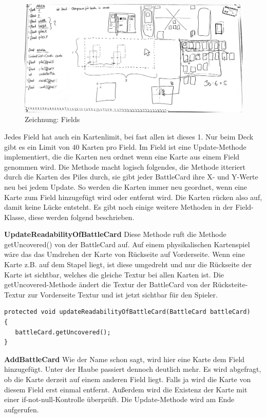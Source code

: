 \begin{figure}[h]
\includegraphics[width=1\textwidth]{../img/bild_fields.JPG}
\caption{Zeichnung: Fields}
\label{fig:Zeichung Fields}
\end{figure}

Jedes Field hat auch ein Kartenlimit, bei fast allen ist dieses 1. Nur beim Deck gibt es ein Limit von 40 Karten pro Field.
Im Field ist eine Update-Methode implementiert, die die Karten neu ordnet wenn eine Karte aus einem Field genommen wird. Die Methode macht logisch folgendes, die Methode itteriert durch die Karten des Piles durch, sie gibt jeder BattleCard ihre X- und Y-Werte neu bei jedem Update. So werden die Karten immer neu geordnet, wenn eine Karte zum Field hinzugefügt wird oder entfernt wird. Die Karten rücken also auf, damit keine Lücke entsteht.
Es gibt noch einige weitere Methoden in der Field-Klasse, diese werden folgend beschrieben.

\textbf{UpdateReadabilityOfBattleCard}
Diese Methode ruft die Methode getUncovered() von der BattleCard auf. Auf einem physikalischen Kartenspiel wäre das das Umdrehen der Karte von Rückseite auf Vorderseite. Wenn eine Karte z.B. auf dem Stapel liegt, ist diese umgedreht und nur die Rückseite der Karte ist sichtbar, welches die gleiche Textur bei allen Karten ist. Die getUncovered-Methode ändert die Textur der BattleCard von der Rücksteite-Textur zur Vorderseite Textur und ist jetzt sichtbar für den Spieler.

\begin{lstlisting}
protected void updateReadabilityOfBattleCard(BattleCard battleCard)
{
   battleCard.getUncovered();
}
\end{lstlisting}

\textbf{AddBattleCard}
Wie der Name schon sagt, wird hier eine Karte dem Field hinzugefügt. Unter der Haube passiert dennoch deutlich mehr. Es wird abgefragt, ob die Karte derzeit auf einem anderen Field liegt. Falls ja wird die Karte von diesem Field erst einmal entfernt. Außerdem wird die Existenz der Karte mit einer if-not-null-Kontrolle überprüft. Die Update-Methode wird am Ende aufgerufen.

